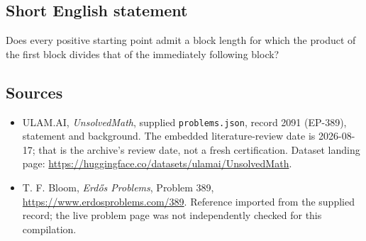 \documentclass[11pt,a4paper]{article}
\begin{document}
\subsection{Short English statement}

Does every positive starting point admit a block length for which the product of the first block divides that of the immediately following block?

\subsection{Sources}

{\small

\begin{itemize}

\item[\hypertarget{source:2091:1}{S1}] ULAM.AI, \emph{UnsolvedMath}, supplied \texttt{problems.json}, record 2091 (EP-389), statement and background. The embedded literature-review date is 2026-08-17; that is the archive’s review date, not a fresh certification. Dataset landing page: \url{https://huggingface.co/datasets/ulamai/UnsolvedMath}.

\item[\hypertarget{source:2091:2}{S2}] T. F. Bloom, \emph{Erdős Problems}, Problem 389, \url{https://www.erdosproblems.com/389}. Reference imported from the supplied record; the live problem page was not independently checked for this compilation.

\end{itemize}

}

\label{end:2091}
\end{document}
